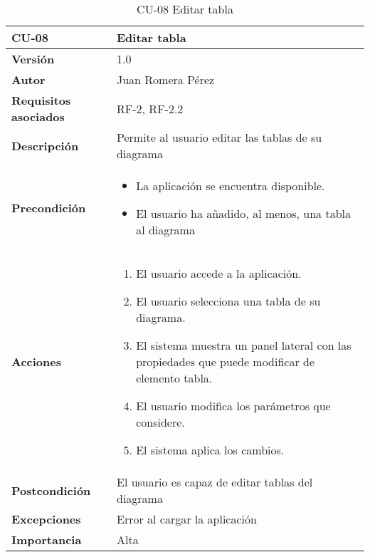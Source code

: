 \begin{table}[p]
    \centering
    \begin{tabularx}{\linewidth}{ p{} p{}}
		\toprule
		\textbf{CU-08}    & \textbf{Editar tabla}\\
		\toprule
		\textbf{Versión}              & 1.0    \\
		\textbf{Autor}                & Juan Romera Pérez \\
		\textbf{Requisitos asociados} & RF-2, RF-2.2 \\
		\textbf{Descripción}          & Permite al usuario editar las tablas de su diagrama \\
		\textbf{Precondición}         & \begin{itemize}
		    \item La aplicación se encuentra disponible.
            \item El usuario ha añadido, al menos, una tabla al diagrama
		\end{itemize} \\
		\textbf{Acciones}             &
		\begin{enumerate}
			\def\labelenumi{\arabic{enumi}.}
			\tightlist
			\item El usuario accede a la aplicación.
			\item El usuario selecciona una tabla de su diagrama.
            \item El sistema muestra un panel lateral con las propiedades que puede modificar de elemento tabla.
            \item El usuario modifica los parámetros que considere.
            \item El sistema aplica los cambios.
		\end{enumerate}\\
		\textbf{Postcondición}        & El usuario es capaz de editar tablas del diagrama \\
		\textbf{Excepciones}          & Error al cargar la aplicación \\
		\textbf{Importancia}          & Alta \\
		\bottomrule
    \end{tabularx}
    \caption{CU-08 Editar tabla}
\end{table}

